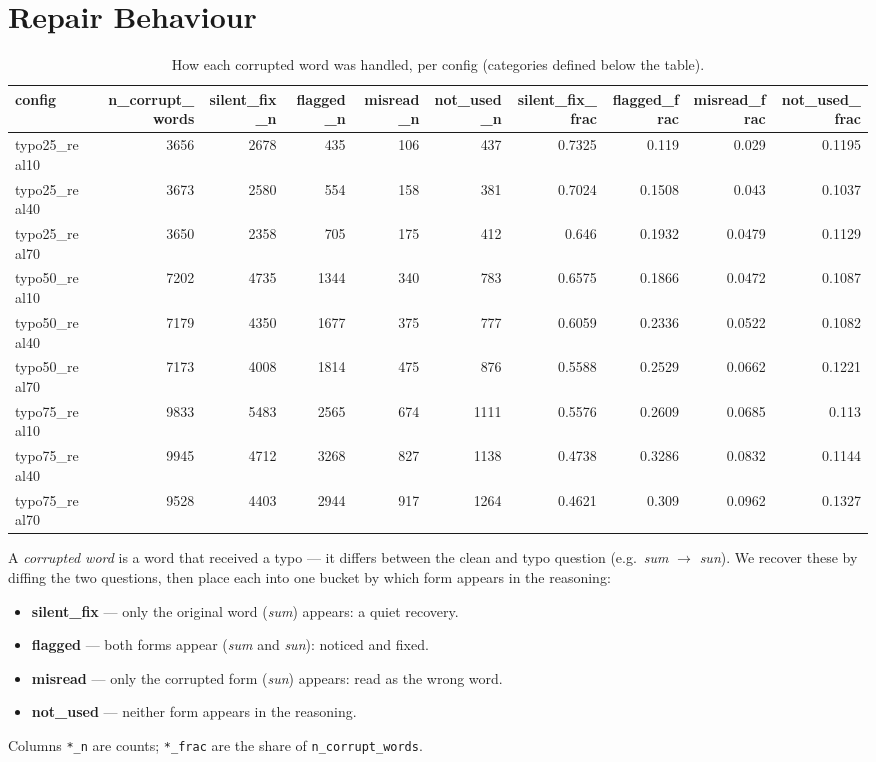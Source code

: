\documentclass[11pt]{article}
\begin{document}
\section*{Repair Behaviour}
\begin{table}[H]
\centering
\caption{How each corrupted word was handled, per config (categories defined below the table).}
\small
\begin{adjustbox}{max width=\textwidth}
\begin{tabular}{lrrrrrrrrr}
\toprule
\textbf{config} & \textbf{n\_corrupt\_words} & \textbf{silent\_fix\_n} & \textbf{flagged\_n} & \textbf{misread\_n} & \textbf{not\_used\_n} & \textbf{silent\_fix\_frac} & \textbf{flagged\_frac} & \textbf{misread\_frac} & \textbf{not\_used\_frac} \\
\midrule
typo25\_real10 & 3656 & 2678 & 435 & 106 & 437 & 0.7325 & 0.119 & 0.029 & 0.1195 \\
typo25\_real40 & 3673 & 2580 & 554 & 158 & 381 & 0.7024 & 0.1508 & 0.043 & 0.1037 \\
typo25\_real70 & 3650 & 2358 & 705 & 175 & 412 & 0.646 & 0.1932 & 0.0479 & 0.1129 \\
typo50\_real10 & 7202 & 4735 & 1344 & 340 & 783 & 0.6575 & 0.1866 & 0.0472 & 0.1087 \\
typo50\_real40 & 7179 & 4350 & 1677 & 375 & 777 & 0.6059 & 0.2336 & 0.0522 & 0.1082 \\
typo50\_real70 & 7173 & 4008 & 1814 & 475 & 876 & 0.5588 & 0.2529 & 0.0662 & 0.1221 \\
typo75\_real10 & 9833 & 5483 & 2565 & 674 & 1111 & 0.5576 & 0.2609 & 0.0685 & 0.113 \\
typo75\_real40 & 9945 & 4712 & 3268 & 827 & 1138 & 0.4738 & 0.3286 & 0.0832 & 0.1144 \\
typo75\_real70 & 9528 & 4403 & 2944 & 917 & 1264 & 0.4621 & 0.309 & 0.0962 & 0.1327 \\
\bottomrule
\end{tabular}
\end{adjustbox}
\end{table}

\noindent A \emph{corrupted word} is a word that received a
typo --- it differs between the clean and typo question (e.g.\ \emph{sum} $\to$
\emph{sun}). We recover these by diffing the two questions, then place each into one
bucket by which form appears in the reasoning:
\begin{itemize}\setlength{\itemsep}{1pt}
  \item \textbf{silent\_fix} --- only the original word (\emph{sum}) appears: a quiet recovery.
  \item \textbf{flagged} --- both forms appear (\emph{sum} and \emph{sun}): noticed and fixed.
  \item \textbf{misread} --- only the corrupted form (\emph{sun}) appears: read as the wrong word.
  \item \textbf{not\_used} --- neither form appears in the reasoning.
\end{itemize}
\noindent Columns \texttt{*\_n} are counts; \texttt{*\_frac} are the share of
\texttt{n\_corrupt\_words}.
\medskip
\end{document}
